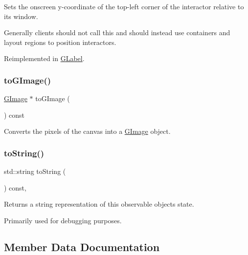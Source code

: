 Sets the onscreen y-\/coordinate of the top-\/left corner of the interactor relative to its window. 

Generally clients should not call this and should instead use containers and layout regions to position interactors. 

Reimplemented in \mbox{\hyperlink{classsgl_1_1GLabel_a0b738606c7aca5c472b66c4e55b3c685}{G\+Label}}.

\mbox{\label{classsgl_1_1GCanvas_aa2b5affed24054a09bddfe568d11200b}} 
\subsubsection{\texorpdfstring{to\+G\+Image()}{toGImage()}}
{\footnotesize\ttfamily \mbox{\hyperlink{classsgl_1_1GImage}{G\+Image}} $\ast$ to\+G\+Image (\begin{DoxyParamCaption}{ }\end{DoxyParamCaption}) const\hspace{0.3cm}{\ttfamily [virtual]}}



Converts the pixels of the canvas into a \mbox{\hyperlink{classsgl_1_1GImage}{G\+Image}} object. 

\mbox{\label{classsgl_1_1GObservable_a1fe5121d6528fdea3f243321b3fa3a49}} 
\subsubsection{\texorpdfstring{to\+String()}{toString()}}
{\footnotesize\ttfamily std\+::string to\+String (\begin{DoxyParamCaption}{ }\end{DoxyParamCaption}) const\hspace{0.3cm}{\ttfamily [virtual]}, {\ttfamily [inherited]}}



Returns a string representation of this observable object\textquotesingle{}s state. 

Primarily used for debugging purposes. 

\subsection{Member Data Documentation}
\mbox{\label{classsgl_1_1GDrawingSurface_a738dd6afc69ac536ad46cf4d89a90933}} 
